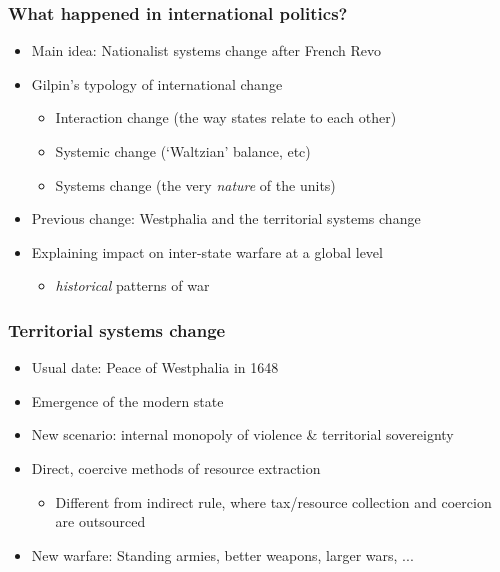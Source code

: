\documentclass[aspectratio=43, handout]{beamer}
\begin{document}
\begin{frame}
\frametitle{What happened in international politics?}
\centering

\begin{itemize}
  \item Main idea: Nationalist systems change after French Revo
  \item Gilpin's typology of international change
  \begin{itemize}
    \item Interaction change (the way states relate to each other)
    \item Systemic change (`Waltzian' balance, etc)
    \item Systems change (the very \textit{nature} of the units)
  \end{itemize}
  \item Previous change: Westphalia and the territorial systems change
  \item Explaining impact on inter-state warfare at a global level
  \begin{itemize}
    \item \textit{historical} patterns of war
  \end{itemize}
 \end{itemize}

\end{frame}

\begin{frame}
\frametitle{Territorial systems change}
\centering

\begin{itemize}
  \item Usual date: Peace of Westphalia in 1648
  \item Emergence of the modern state
  \item New scenario: internal monopoly of violence \& territorial sovereignty
  \item Direct, coercive methods of resource extraction
  \begin{itemize}
    \item Different from indirect rule, where tax/resource collection and coercion are outsourced
  \end{itemize}
  \item New warfare: Standing armies, better weapons, larger wars, ...
\end{itemize}

\end{frame}
\end{document}
